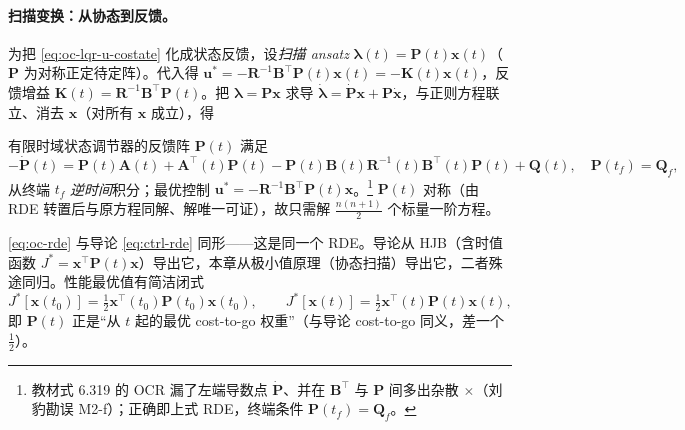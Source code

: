 \paragraph{扫描变换：从协态到反馈。}
为把 \cref{eq:oc-lqr-u-costate} 化成状态反馈，设\emph{扫描 ansatz} $\boldsymbol\lambda(t)=\mathbf P(t)\mathbf x(t)$（$\mathbf P$ 为对称正定待定阵）。代入得 $\mathbf u^*=-\mathbf R^{-1}\mathbf B^\top\mathbf P(t)\mathbf x(t)=-\mathbf K(t)\mathbf x(t)$，反馈增益 $\mathbf K(t)=\mathbf R^{-1}\mathbf B^\top\mathbf P(t)$。把 $\boldsymbol\lambda=\mathbf P\mathbf x$ 求导 $\dot{\boldsymbol\lambda}=\dot{\mathbf P}\mathbf x+\mathbf P\dot{\mathbf x}$，与正则方程联立、消去 $\mathbf x$（对所有 $\mathbf x$ 成立），得

\begin{theorem}\label{thm:oc-rde}
有限时域状态调节器的反馈阵 $\mathbf P(t)$ 满足
\begin{equation}
  \boxed{-\dot{\mathbf P}(t)=\mathbf P(t)\mathbf A(t)+\mathbf A^\top(t)\mathbf P(t)-\mathbf P(t)\mathbf B(t)\mathbf R^{-1}(t)\mathbf B^\top(t)\mathbf P(t)+\mathbf Q(t),\quad\mathbf P(t_f)=\mathbf Q_f,}
  \label{eq:oc-rde}
\end{equation}
从终端 $t_f$ \emph{逆时间}积分；最优控制 $\mathbf u^*=-\mathbf R^{-1}\mathbf B^\top\mathbf P(t)\mathbf x$。\footnote{教材式 6.319 的 OCR 漏了左端导数点 $\dot{\mathbf P}$、并在 $\mathbf B^\top$ 与 $\mathbf P$ 间多出杂散 $\times$（刘豹勘误 M2-f）；正确即上式 RDE，终端条件 $\mathbf P(t_f)=\mathbf Q_f$。}
$\mathbf P(t)$ 对称（由 RDE 转置后与原方程同解、解唯一可证），故只需解 $\tfrac{n(n+1)}{2}$ 个标量一阶方程。
\end{theorem}

\noindent \cref{eq:oc-rde} 与导论 \cref{eq:ctrl-rde} 同形——这是同一个 RDE。导论从 HJB（含时值函数 $J^*=\mathbf x^\top\mathbf P(t)\mathbf x$）导出它，本章从极小值原理（协态扫描）导出它，二者殊途同归。性能最优值有简洁闭式
\begin{equation}
  J^*[\mathbf x(t_0)]=\tfrac12\mathbf x^\top(t_0)\mathbf P(t_0)\mathbf x(t_0),\qquad J^*[\mathbf x(t)]=\tfrac12\mathbf x^\top(t)\mathbf P(t)\mathbf x(t),
  \label{eq:oc-lqr-Jstar}
\end{equation}
即 $\mathbf P(t)$ 正是“从 $t$ 起的最优 cost-to-go 权重”（与导论 cost-to-go 同义，差一个 $\tfrac12$）。

